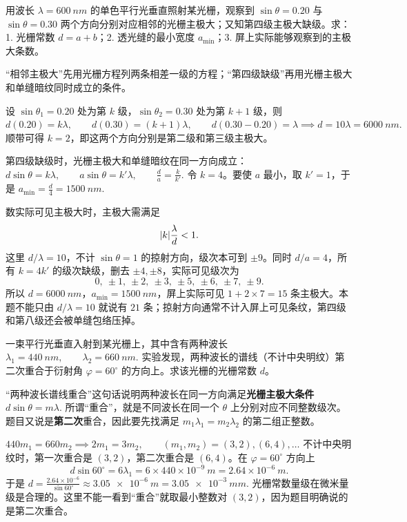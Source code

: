 \documentclass[lang=cn,11pt]{elegantbook}
\begin{document}
\begin{exercise}
用波长 \(\lambda=\SI{600}{nm}\) 的单色平行光垂直照射某光栅，观察到 \(\sin\theta=0.20\) 与 \(\sin\theta=0.30\) 两个方向分别对应相邻的光栅主极大；又知第四级主极大缺级。求：1. 光栅常数 \(d=a+b\)；2. 透光缝的最小宽度 \(a_{\min}\)；3. 屏上实际能够观察到的主极大条数。
\end{exercise}

\begin{solution}
“相邻主极大”先用光栅方程列两条相差一级的方程；“第四级缺级”再用光栅主极大和单缝暗纹同时成立的条件。

设 \(\sin\theta_1=0.20\) 处为第 \(k\) 级，\(\sin\theta_2=0.30\) 处为第 \(k+1\) 级，则
 \(d(0.20)=k\lambda,\qquad d(0.30)=(k+1)\lambda,\qquad d(0.30-0.20)=\lambda \implies d=10\lambda=\SI{6000}{nm}.\) 
顺带可得 \(k=2\)，即这两个方向分别是第二级和第三级主极大。

第四级缺级时，光栅主极大和单缝暗纹在同一方向成立：
 \(d\sin\theta=k\lambda,\qquad a\sin\theta=k'\lambda,\qquad \frac{d}{a}=\frac{k}{k'}.\) 
令 \(k=4\)。要使 \(a\) 最小，取 \(k'=1\)，于是
 \(a_{\min}=\frac{d}{4}=\SI{1500}{nm}.\) 

数实际可见主极大时，主极大需满足
\[
\abs{k}\frac{\lambda}{d}<1.
\]
这里 \(d/\lambda=10\)，不计 \(\sin\theta=1\) 的掠射方向，级次本可到 \(\pm9\)。同时 \(d/a=4\)，所有 \(k=4k'\) 的级次缺级，删去 \(\pm4,\pm8\)，实际可见级次为
\[
0,\ \pm1,\ \pm2,\ \pm3,\ \pm5,\ \pm6,\ \pm7,\ \pm9.
\]
所以 \(d=\SI{6000}{nm}\)，\(a_{\min}=\SI{1500}{nm}\)，屏上实际可见 \(1+2\times7=15\) 条主极大。本题不能只由 \(d/\lambda=10\) 就说有 \(21\) 条；掠射方向通常不计入屏上可见条纹，第四级和第八级还会被单缝包络压掉。
\end{solution}


\begin{exercise}[两种波长第二次重合时怎样反推光栅常数]
一束平行光垂直入射到某光栅上，其中含有两种波长
 \(\lambda_1=\SI{440}{nm},\qquad \lambda_2=\SI{660}{nm}.\) 
实验发现，两种波长的谱线（不计中央明纹）第二次重合于衍射角 \(\varphi=60^\circ\) 的方向上。求该光栅的光栅常数 \(d\)。
\end{exercise}

\begin{solution}
“两种波长谱线重合”这句话说明两种波长在同一方向满足\textbf{光栅主极大条件}
 \(d\sin\theta=m\lambda.\) 
所谓“重合”，就是不同波长在同一个 \(\theta\) 上分别对应不同整数级次。题目又说是\textbf{第二次}重合，因此要先找满足
 \(m_1\lambda_1=m_2\lambda_2\) 
的第二组正整数。

 \(440m_1=660m_2 \implies 2m_1=3m_2, \qquad (m_1,m_2)=(3,2),(6,4),\dots\) 
不计中央明纹时，第一次重合是 \((3,2)\)，第二次重合是 \((6,4)\)。在 \(\varphi=60^\circ\) 方向上
\[
d\sin 60^\circ=6\lambda_1=6\times 440\times 10^{-9}\ \si{m}=2.64\times10^{-6}\ \si{m}.
\]
于是
 \(d=\frac{2.64\times10^{-6}}{\sin 60^\circ} \approx \SI{3.05e-6}{m}=\SI{3.05e-3}{mm}.\) 
光栅常数量级在微米量级是合理的。这里不能一看到“重合”就取最小整数对 \((3,2)\)，因为题目明确说的是第二次重合。
\end{solution}
\end{document}
